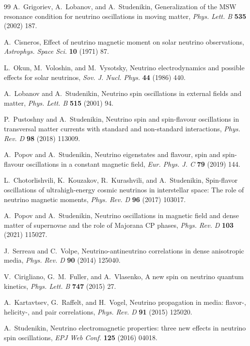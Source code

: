 \documentclass[a4paper,11pt]{article}
\begin{document}
\begin{thebibliography}{99}
A.~Grigoriev, A.~Lobanov, and A.~Studenikin,
Generalization of the MSW resonance condition for neutrino oscillations in moving matter,
{\em Phys. Lett. B} {\bf 535} (2002) 187.

A.~Cisneros,
Effect of neutrino magnetic moment on solar neutrino observations,
{\em Astrophys. Space Sci.} {\bf 10} (1971) 87.

L.~Okun, M.~Voloshin, and M.~Vysotsky,
Neutrino electrodynamics and possible effects for solar neutrinos,
{\em Sov. J. Nucl. Phys.} {\bf 44} (1986) 440.

A.~Lobanov and A.~Studenikin,
Neutrino spin oscillations in external fields and matter,
{\em Phys. Lett. B} {\bf 515} (2001) 94.

P.~Pustoshny and A.~Studenikin,
Neutrino spin and spin-flavour oscillations in transversal matter currents with standard and non-standard interactions,
{\em Phys. Rev. D} {\bf 98} (2018) 113009.

A.~Popov and A.~Studenikin,
Neutrino eigenstates and flavour, spin and spin-flavour oscillations in a constant magnetic field,
{\em Eur. Phys. J. C} {\bf 79} (2019) 144.

L.~Chotorlishvili, K.~Kouzakov, R.~Kurashvili, and A.~Studenikin,
Spin-flavor oscillations of ultrahigh-energy cosmic neutrinos in interstellar space: The role of neutrino magnetic moments,
{\em Phys. Rev. D} {\bf 96} (2017) 103017.

A.~Popov and A.~Studenikin,
Neutrino oscillations in magnetic field and dense matter of supernovae and the role of Majorana CP phases,
{\em Phys. Rev. D} {\bf 103} (2021) 115027.

J.~Serreau and C.~Volpe,
Neutrino-antineutrino correlations in dense anisotropic media,
{\em Phys. Rev. D} {\bf 90} (2014) 125040.

V.~Cirigliano, G.~M.~Fuller, and A.~Vlasenko,
A new spin on neutrino quantum kinetics,
{\em Phys. Lett. B} {\bf 747} (2015) 27.

A.~Kartavtsev, G.~Raffelt, and H.~Vogel,
Neutrino propagation in media: flavor-, helicity-, and pair correlations,
{\em Phys. Rev. D} {\bf 91} (2015) 125020.

A.~Studenikin,
Neutrino electromagnetic properties: three new effects in neutrino spin oscillations,
{\em EPJ Web Conf.} {\bf 125} (2016) 04018.


\end{thebibliography}
\end{document}
